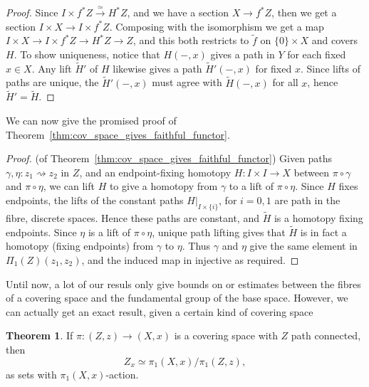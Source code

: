 \documentclass{tufte-handout}
\newcommand{\lecturenum}[1]{\marginnote{\color{red}Lecture #1}}
\theoremstyle{definition}
\newtheorem{theorem}{Theorem}
\begin{document}
\begin{proof}
Since $I\times f^*Z \xrightarrow{\simeq} H^*Z$, and we have a section $X\to f^*Z$, then 
we get a section $I\times X \to I\times f^*Z$. Composing with the isomorphism we get a 
map $I\times X \to I\times f^*Z \to H^* Z \to Z$, and this both restricts to 
$\widetilde{f}$ on $\{0\}\times X$ and covers $H$. To show uniqueness, notice that 
$H(-,x)$ gives a path in $Y$ for each fixed $x\in X$. Any lift $\widetilde{H}'$ of $H$ 
likewise gives a path $\widetilde{H}'(-,x)$ for fixed $x$. Since lifts of paths are unique, the 
$\widetilde{H}'(-,x)$ must agree with $\widetilde{H}(-,x)$ for all $x$, hence 
$\widetilde{H}'=\widetilde{H}$.
\end{proof}

We can now give the promised proof of Theorem~\ref{thm:cov_space_gives_faithful_functor}.

\begin{proof}
(of Theorem~\ref{thm:cov_space_gives_faithful_functor}) Given paths $\gamma,\eta\colon z_1 \rightsquigarrow z_2$ in $Z$, and an endpoint-fixing homotopy 
$H\colon I\times I \to X$ between $\pi\circ \gamma$ and $\pi\circ\eta$, we can lift $H$ to give
a homotopy from $\gamma$ to a lift of $\pi\circ \eta$. Since $H$ fixes endpoints, the lifts of
the constant paths $H\big|_{I\times\{i\}}$, for $i=0,1$ are path in the fibre, discrete spaces.
Hence these paths are constant, and $\widetilde{H}$ is a homotopy fixing endpoints.
Since $\eta$ is a lift of $\pi\circ \eta$, unique path lifting gives that $\widetilde{H}$ is 
in fact a homotopy (fixing endpoints) from $\gamma$ to $\eta$. Thus $\gamma$ and $\eta$ give
the same element in $\Pi_1(Z)(z_1,z_2)$, and the induced map in injective as required. 
\end{proof}

Until now, a lot of our resuls only give bounds on or estimates between the fibres of a covering
space and the fundamental group of the base space. However, we can actually get an exact result, given a certain kind of covering space

\begin{theorem}
If $\pi\colon (Z,z) \to (X,x)$ is a covering space with $Z$ path connected, then  
\[
Z_x \simeq \pi_1(X,x)/\pi_1(Z,z),
\]
as sets with $\pi_1(X,x)$-action.
\end{theorem}

\lecturenum{10}
\end{document}
